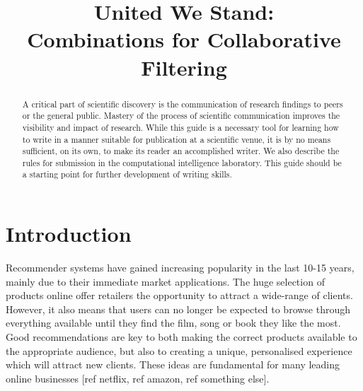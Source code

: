 \documentclass[10pt,conference,compsocconf]{IEEEtran}
\begin{document}
\title{United We Stand:\\ Combinations for Collaborative Filtering}

\author{
	\and
	\and
}


\maketitle

\begin{abstract}
  A critical part of scientific discovery is the
  communication of research findings to peers or the general public.
  Mastery of the process of scientific communication improves the
  visibility and impact of research. While this guide is a necessary
  tool for learning how to write in a manner suitable for publication
  at a scientific venue, it is by no means sufficient, on its own, to
  make its reader an accomplished writer. We also describe the rules
  for submission in the computational intelligence laboratory.
  This guide should be a
  starting point for further development of writing skills.
\end{abstract}

\section{Introduction}

Recommender systems have gained increasing popularity in the last 10-15 years, mainly due to their immediate market applications. The huge selection of products online offer retailers the opportunity to attract a wide-range of clients. However, it also means that users can no longer be expected to browse through everything available until they find the film, song or book they like the most. Good recommendations are key to both making the correct products available to the appropriate audience, but also to creating a unique, personalised experience which will attract new clients. These ideas are fundamental for many leading online businesses [ref netflix, ref amazon, ref something else].
\end{document}
